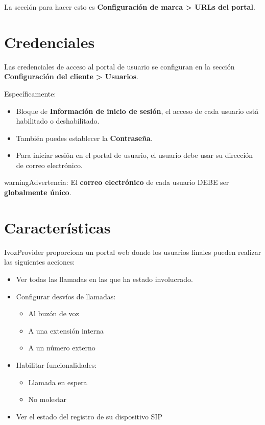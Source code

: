 \documentclass[letterpaper,10pt,spanish]{sphinxmanual}
\begin{document}
La sección para hacer esto es \textbf{Configuración de marca \textgreater{} URLs del portal}.


\section{Credenciales}
\label{user_portal/credentials:credentials}\label{user_portal/credentials::doc}
Las credenciales de acceso al portal de usuario se configuran en la sección \textbf{Configuración del cliente \textgreater{} Usuarios}.

Específicamente:
\begin{itemize}
\item {} 
Bloque de \textbf{Información de inicio de sesión}, el acceso de cada usuario está habilitado o deshabilitado.

\item {} 
También puedes establecer la \textbf{Contraseña}.

\item {} 
Para iniciar sesión en el portal de usuario, el usuario debe usar su dirección de correo electrónico.

\end{itemize}

\begin{notice}{warning}{Advertencia:}
El \textbf{correo electrónico} de cada usuario DEBE ser \textbf{globalmente único}.
\end{notice}


\section{Características}
\label{user_portal/features::doc}\label{user_portal/features:features}
IvozProvider proporciona un portal web donde los usuarios finales pueden realizar las siguientes acciones:
\begin{itemize}
\item {} 
Ver todas las llamadas en las que ha estado involucrado.

\item {} 
Configurar desvíos de llamadas:
\begin{itemize}
\item {} 
Al buzón de voz

\item {} 
A una extensión interna

\item {} 
A un número externo

\end{itemize}

\item {} 
Habilitar funcionalidades:
\begin{itemize}
\item {} 
Llamada en espera

\item {} 
No molestar

\end{itemize}

\item {} 
Ver el estado del registro de su dispositivo SIP

\end{itemize}
\end{document}
